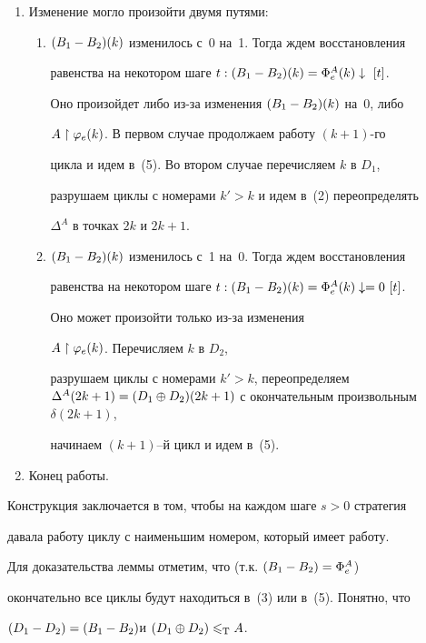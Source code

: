 \begin{pf}
\begin{enumerate}
\begin{enumerate}
циклы с номерами $k'>k$, идем в~(4).


\end{enumerate}


\item Изменение могло произойти двумя путями:


\begin{enumerate}


\item $(B_1-B_2)(k)$ изменилось с~0 на~1. Тогда ждем восстановления


равенства на некотором шаге $t:(B_1-B_2)(k)=\Phi_e^A(k)\downarrow~[t]$.


Оно произойдет либо из-за изменения $(B_1-B_2)(k)$ на~0, либо


$A\restriction\varphi_e(k)$. В первом случае продолжаем работу $(k+1)$-го


цикла и идем в~(5). Во втором случае перечисляем $k \mbox{ в } D_1 $,


разрушаем циклы с номерами $k'>k$ и идем в~(2) переопределять


$\Delta^A$ в точках $2k$ и $2k+1$.


\item $(B_1-B_2)(k)$ изменилось с~1 на~0. Тогда ждем восстановления


равенства на некотором шаге $t:(B_1-B_2)(k)=\Phi_e^A(k)\downarrow=0~[t]$.


Оно может произойти только из-за изменения


$A\restriction\varphi_e(k)$. Перечисляем $k$ в $D_2$,


разрушаем циклы с номерами $k'>k$, переопределяем $\Delta^A(2k+1)=


\dsum(2k+1)$ с окончательным произвольным $\delta(2k+1)$,


начинаем $(k+1)$--й цикл и идем в~(5).


\end{enumerate}


\item Конец работы.


\end{enumerate}





Конструкция заключается в том, чтобы на каждом шаге $s>0$ стратегия


давала работу циклу с наименьшим номером, который имеет работу.





Для доказательства леммы отметим, что (т.к. $(B_1-B_2)=\Phi_e^A$)


окончательно все циклы будут находиться в~(3) или в~(5). Понятно, что


$(D_1-D_2)=(B_1-B_2)$и $(D_1\oplus D_2)\leqslant_{\mathrm T}A$.


\end{pf}





